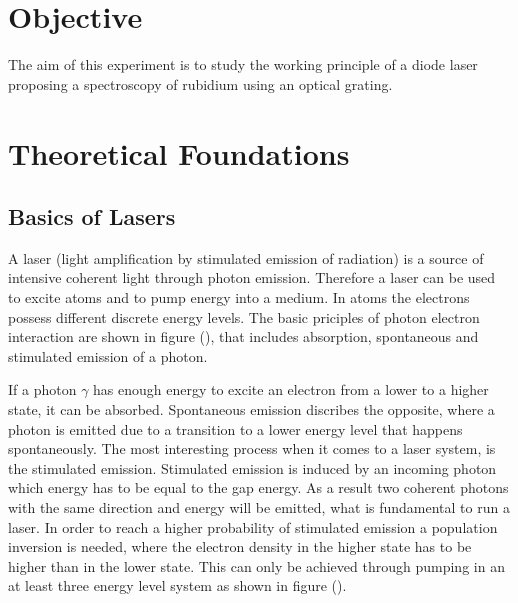 \section{Objective}
The aim of this experiment is to study the working principle of a diode laser proposing a spectroscopy of rubidium using an optical grating.


\section{Theoretical Foundations}
\subsection{Basics of Lasers}

\noindent
A laser (light amplification by stimulated emission of radiation) is a source of intensive coherent light through photon emission.
Therefore a laser can be used to excite atoms and to pump energy into a medium.
In atoms the electrons possess different discrete energy levels.
The basic priciples of photon electron interaction are shown in figure (),
that includes absorption, spontaneous and stimulated emission of a photon.



\noindent
If a photon $\gamma$ has enough energy to excite an electron from a lower to a higher state, it can be absorbed.
Spontaneous emission discribes the opposite, where a photon is emitted due to a transition to a lower energy level that happens spontaneously.
The  most interesting process when it comes to a laser system, is the stimulated emission.
Stimulated emission is induced by an incoming photon which energy has to be equal to the gap energy.
As a result two coherent photons with the same direction and energy will be emitted, what is fundamental to run a laser.
In order to reach a higher probability of stimulated emission a population inversion is needed, where the electron density in the higher state has to be higher than in the lower state.
This can only be achieved through pumping in an at least three energy level system as shown in figure ().


